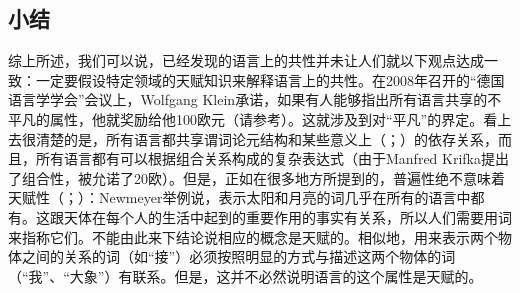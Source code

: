 \subsection{小结}
\label{Abschnitt-Universalien-Zusammenfassung}

综上所述，我们可以说，已经发现的语言上的共性并未让人们就以下观点达成一致：一定要假设特定领域的天赋知识来解释语言上的共性。在2008年召开的“德国语言学学会”会议上，Wolfgang Klein承诺，如果有人能够指出所有语言共享的不平凡的属性，他就奖励给他100欧元（请参考\citealp{Klein2009a}）。这就涉及到对“平凡”的界定。看上去很清楚的是，所有语言都共享谓词论元结构和某些意义上（\citealp[]{Hudson2010a}；\citealp[]{LR2010a}）的依存关系，而且，所有语言都有可以根据组合关系构成的复杂表达式（由于Manfred Krifka提出了组合性，被允诺了20欧）。但是，正如在很多地方所提到的，普遍性绝不意味着天赋性（\citealp[]{Bates84a}；\citealp[]{Newmeyer2005a}）：Newmeyer举例说，表示太阳和月亮的词几乎在所有的语言中都有。这跟天体在每个人的生活中起到的重要作用的事实有关系，所以人们需要用词来指称它们。不能由此来下结论说相应的概念是天赋的。相似地，用来表示两个物体之间的关系的词（如“接”）必须按照明显的方式与描述这两个物体的词（“我”、“大象”）有联系。但是，这并不必然说明语言的这个属性是天赋的。

